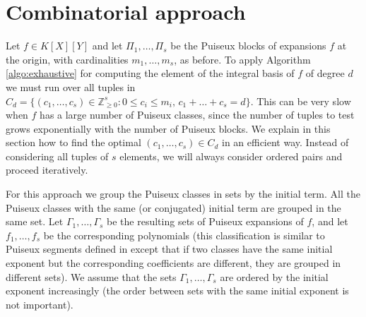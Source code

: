 \documentclass[a4paper,11pt]{amsart}%
\theoremstyle{definition}
\theoremstyle{plain}
\theoremstyle{remark}
\newcommand{\Z}{{\mathbb Z}}
\begin{document}
\section{Combinatorial approach}

%
%
%
%

Let $f \in K[X][Y]$ and let $\Pi_1, \dots, \Pi_s$ be the Puiseux blocks of expansions $f$ at the origin, with cardinalities $m_1, \dots, m_s$, as before. To apply Algorithm \ref{algo:exhaustive} for computing the element of the integral basis of $f$ of degree $d$ we must run over all tuples in $C_{d} = \{(c_1, \dots, c_s) \in \Z_{\ge 0}^s : 0 \leq c_i \leq m_i \mbox{, } c_1 + \dots + c_s = d\}$.
This can be very slow when $f$ has a large number of Puiseux classes, since the number of tuples to test grows exponentially with the number of Puiseux blocks.
We explain in this section how to find the optimal $(c_{1}, \dots, c_{s}) \in C_{d}$ in an
efficient way. Instead of considering all tuples of $s$ elements, we will always
consider ordered pairs and proceed iteratively.

For this approach we group the Puiseux classes in sets by the initial term. All the Puiseux classes with the same (or conjugated) initial term are grouped in the same set. Let $\Gamma_1, \dots, \Gamma_s$ be the resulting sets of Puiseux expansions of $f$, and let $f_1, \dots, f_s$ be the corresponding polynomials (this classification is similar to Puiseux segments defined in \cite[Section 7.2]{intbas} except that if two classes have the same initial exponent but the corresponding coefficients are different, they are grouped in different sets).
We assume that the sets $\Gamma_1, \dots, \Gamma_s$ are ordered by the initial exponent increasingly (the order between sets with the same initial exponent is not important).
\end{document}

